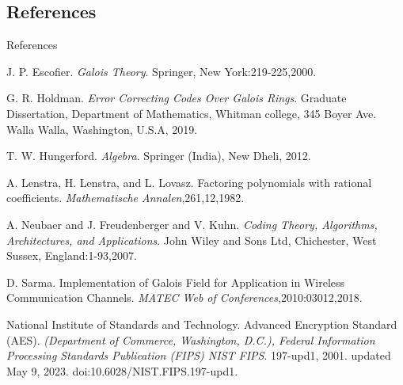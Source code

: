 \documentclass{beamer}
\begin{document}
\subsection{References}
\begin{frame}{References}
  \footnotesize

  \begin{thebibliography}{9}

    J. P. Escofier. \emph{Galois Theory}. Springer, New York:219-225,2000.

    G. R. Holdman. \emph{Error Correcting Codes  Over Galois Rings}. Graduate Dissertation, Department of Mathematics, Whitman college, 345 Boyer Ave.
    Walla Walla, Washington, U.S.A, 2019.

    T. W. Hungerford. \emph{Algebra}. Springer (India), New Dheli, 2012.

    A. Lenstra, H. Lenstra, and L. Lovasz. Factoring polynomials with rational coefficients. \emph{Mathematische Annalen},261,12,1982.

    A. Neubaer and J. Freudenberger and V. Kuhn. \emph{Coding Theory, Algorithms, Architectures, and Applications}. John Wiley and Sons Ltd, Chichester, West Sussex, England:1-93,2007.

    D. Sarma. Implementation of Galois Field for Application in Wireless Communication Channels. \emph{MATEC Web of Conferences},2010:03012,2018.

    National Institute of Standards and Technology. Advanced Encryption
    Standard (AES). \emph{(Department of Commerce, Washington, D.C.), Federal Information Processing Standards Publication (FIPS) NIST FIPS}. 197-upd1, 2001. updated May 9, 2023. doi:10.6028/NIST.FIPS.197-upd1.
  \end{thebibliography}
\end{frame}
\end{document}
